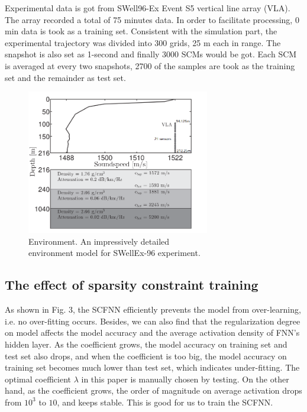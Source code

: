 Experimental data is got from SWell96-Ex Event S5 vertical line array (VLA). The array recorded a total of 75 minutes data. In order to facilitate processing, 0 min data is took as a training set.
Consistent with the simulation part, the experimental trajectory was divided into 300 grids, 25 m each in range. The snapshot is also set as 1-second and finally 3000 SCMs would be got. Each SCM is averaged at every two snapshots, 2700 of the samples are took as the training set and the remainder as test set.
\begin{figure}
\includegraphics[width=8cm]{figure/environment}
\caption{Environment. An impressively detailed \\environment model for SWellEx-96 experiment.}
\end{figure}
\subsection{The effect of sparsity constraint training}
As shown in Fig. 3, the SCFNN efficiently prevents the model from over-learning, i.e. no over-fitting occurs.
Besides, we can also find that the regularization degree on model affects the model accuracy and the average activation density of FNN's hidden layer. As the coefficient grows, the model accuracy on training set and test set also drops,
and when the coefficient is too big, the model accuracy on training set becomes much lower than test set, which indicates under-fitting.
The optimal coefficient $\lambda$ in this paper is manually chosen by testing.
On the other hand, as the coefficient grows, the order of magnitude on average activation drops from $10^{3}$ to $10$, and keeps stable. This is good for us to train the SCFNN.

